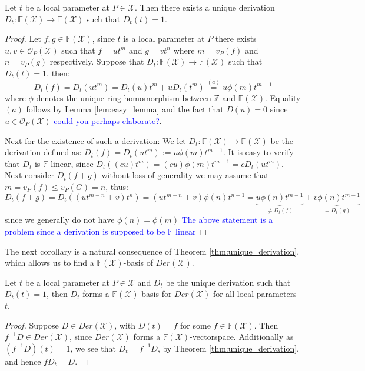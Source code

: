 \begin{theorem}\label{thm:unique_derivation}
  Let $t$ be a local parameter at $P \in \mathcal{X}$. Then there exists a unique derivation $D_t: \mathbb{F}(\mathcal{X}) \to \mathbb{F}(\mathcal{X})$ such that $D_t(t) = 1$.
\end{theorem}
\begin{proof}
  Let $f, g \in \mathbb{F}(\mathcal{X})$, since $t$ is a local parameter at $P$ there exists $u, v \in \mathcal{O}_P(\mathcal{X})$ such that $f = u t^m$ and $g = v t^n$ where $m = v_P(f)$ and $n = v_P(g)$ respectively. Suppose that $D_t: \mathbb{F}(\mathcal{X}) \to \mathbb{F}(\mathcal{X})$ such that $D_t(t) = 1$, then:
  \begin{equation*}
    D_t(f) = D_t(u t^m) = D_t(u) t^m + uD_t(t^{m}) \stackrel{(a)}{=} u \phi(m) t^{m - 1}
  \end{equation*}
  where $\phi$ denotes the unique ring homomorphism between $\mathbb{Z}$ and $\mathbb{F}(\mathcal{X})$. Equality $(a)$ follows by Lemma \ref{lem:easy_lemma} and the fact that $D(u) = 0$ since $u \in \mathcal{O}_P(\mathcal{X})$ \textcolor{blue}{could you perhaps elaborate?}.

  Next for the existence of such a derivation: We let $D_t: \mathbb{F}(\mathcal{X}) \to \mathbb{F}(\mathcal{X})$ be the derivation defined as: $D_t(f) = D_t(u t^{m}) := u \phi(m) t^{m - 1}$. It is easy to verify that $D_{t}$ is $\mathbb{F}$-linear, since $D_t((c u)t^{m}) = (cu) \phi(m) t^{m - 1} = c D_t(ut^{m})$. Next consider $D_t(f + g)$ without loss of generality we may assume that $m = v_P(f) \leq v_P(G) = n$, thus:
  \begin{equation*}
    D_t(f + g) = D_t((u t^{m - n} + v)t^{n}) = (ut^{m - n} + v) \phi(n) t^{n - 1} = \underset{\neq D_t(f)}{\underbrace{u \phi(n) t^{m  - 1}}} + \underset{=D_t(g)}{\underbrace{v \phi(n) t^{m - 1}}}
  \end{equation*}
  since we generally do not have $\phi(n) = \phi(m)$ \textcolor{blue}{The above statement is a problem since a derivation is supposed to be $\mathbb{F}$ linear}
\end{proof}

The next corollary is a natural consequence of Theorem \ref{thm:unique_derivation}, which allows us to find a $\mathbb{F}(\mathcal{X})$-basis of $Der(\mathcal{X})$.
\begin{corollary}\label{cor:D_t_forms_basis}
  Let $t$ be a local parameter at $P \in \mathcal{X}$ and $D_t$ be the unique derivation such that $D_t(t) = 1$, then $D_t$ forms a $\mathbb{F}(\mathcal{X})$-basis for $Der(\mathcal{X})$ for all local parameters $t$.
\end{corollary}
\begin{proof}
  Suppose $D \in Der(\mathcal{X})$, with $D(t) = f$ for some $f \in \mathbb{F}(\mathcal{X})$. Then $f^{-1} D \in Der(\mathcal{X})$, since $Der(\mathcal{X})$ forms a $\mathbb{F}(\mathcal{X})$-vectorspace. Additionally as $(f^{-1}D)(t) = 1$, we see that $D_t = f^{-1}D$, by Theorem \ref{thm:unique_derivation}, and hence $fD_t = D$.
\end{proof}

